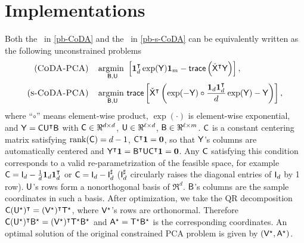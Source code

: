 \documentclass{article}
\begin{document}

\section{Implementations}\label{sec:codaae}

Both the \CoDAPCA~in \eqref{pb-CoDA} and the \surrogateCoDAPCA~in \eqref{pb-s-CoDA} can be
equivalently written as the following unconstrained problems
\begin{align}
(\textsc{CoDA-PCA})\quad\operatorname*{arg\!\min~}_{\mathsf{B},\mathsf{U}}
& \left[\bm{1}_d^\intercal \exp(\mathsf{Y}) \bm{1}_m
- \mathsf{trace}\left( \check{\mathsf{X}}^\intercal\mathsf{Y} \right) \right],\label{eq:unconstrainedcoda}\\
(\textsc{s-}\textsc{CoDA-PCA})\quad\operatorname*{arg\!\min~}_{\mathsf{B},\mathsf{U}}
& \mathsf{trace}\left[
\check{\mathsf{X}}^\intercal \left(
\exp(-\mathsf{Y}) \circ \frac{\bm{1}_d\bm{1}_d^\intercal}{d} \exp(\mathsf{Y}) - \mathsf{Y}
\right)\right],\label{eq:unconstrainedscoda}
\end{align}
where
``$\circ$'' means element-wise product,
$\exp(\cdot)$ is element-wise exponential,
and $\mathsf{Y} = \mathsf{C} \mathsf{U}^\intercal \mathsf{B}$ with $\mathsf{C}\in\Re^{d\times{d}}$, $\mathsf{U}\in\Re^{\ell\times{d}}$, $\mathsf{B}\in\Re^{\ell\times{m}}$.
$\mathsf{C}$ is a constant centering matrix satisfying $\mathrm{rank}(\mathsf{C})=d-1$, $\mathsf{C}^\intercal \bm{1} = \bm{0}$,
so that $\mathsf{Y}$'s columns are automatically centered and
$\mathsf{Y}^\intercal\bm{1}=\mathsf{B}^\intercal\mathsf{U}\mathsf{C}^\intercal\bm{1}=\bm{0}$.
Any $\mathsf{C}$ satisfying this condition corresponds to a valid re-parametrization of the
feasible space, for example $\mathsf{C}=\mathsf{I}_{d}-\frac{1}{d}\bm{1}_d\bm{1}_d^\intercal$ or $\mathsf{C}=\mathsf{I}_d-\mathsf{I}_d^{\sharp}$
($\mathsf{I}_d^{\sharp}$ circularly raises the diagonal entries of $\mathsf{I}_d$ by 1 row).
$\mathsf{U}$'s rows form a nonorthogonal basis of $\Re^{d}$.
$\mathsf{B}$'s columns are the sample coordinates in such a basis.
After optimization, we take the QR decomposition $\mathsf{C}(\mathsf{U}^\star)^\intercal=(\mathsf{V}^\star)^\intercal\mathsf{T}^\star$,
where $\mathsf{V}^\star$'s rows are orthonormal.
Therefore $\mathsf{C}(\mathsf{U}^\star)^\intercal \mathsf{B}^\star=(\mathsf{V}^\star)^\intercal\mathsf{T}^\star\mathsf{B}^\star$
and $\mathsf{A}^\star=\mathsf{T}^\star\mathsf{B}^\star$ is the corresponding coordinates.
An optimal solution of the original constrained PCA problem is given by $(\mathsf{V}^\star, \mathsf{A}^\star)$.
\end{document}
